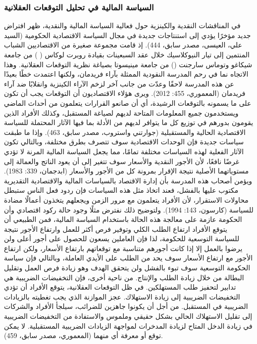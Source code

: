 \documentclass[10pt,a4paper]{report}
\begin{document}
\begin{doublespacing}
\subsubsection{السياسة المالية في تحليل التوقعات العقلانية}
في المناقشات النقدية والكينزية حول فعالية السياسة المالية والنقدية، ظهر افتراض جديد مؤخرًا يؤدي إلى استنتاجات جديدة في مجال السياسة الاقتصادية الحكومية {(السيد علي، العيسى، مصدر سابق، 444)}. إذ قامت مجموعة صغيرة من الاقتصاديين الشباب المنتمين إلى تيار النيوكلاسيك خلال عقد السبعينات بقيادة {روبرت لوكاس ( )} من جامعة شيكاغو و{توماس سارجنت ()} من جامعة مينيسوتا بصياغة نظرية التوقعات العقلانية. وهذا الاتجاه نما في رحم المدرسة النقودية الممثلة بآراء {فريدمان}، ولكنها اعتمدت خطًا بعيدًا عن هذه المدرسة لاحقًا وعدّت من جانب آخر لزخم الآراء الكينزية وانقلابًا ضد آراء {فريدمان} {(المعموري، 455: 2012)}. ويرى هؤلاء الاقتصاديون أن التوقعات يجب أن تكون على ما يسمونه بالتوقعات الرشيدة، أي أن صانعو القرارات يتعلمون من أحداث الماضي ويستخدمون جميع المعلومات المتاحة لديهم لصياغة المستقبل، وكذلك الأفراد الذين يقومون بدورهم في توزيع كل ما يتوافر لديهم من الأدلة بما فيها الآثار المحتملة للسياسة الاقتصادية الحالية والمستقبلية {(جوارتني واستروب، مصدر سابق، 463)}. وإذا ما طبقت سياسات جديدة فإن الوحدات الاقتصادية سوف تتصرف بطرق مختلفة، وبالتالي تكون الآثار الفعلية لهذه السياسات مختلفة تمامًا، مما يجعل السياسة المالية المرنة لا تؤدي غرضًا نافعًا، لأن الأجور النقدية والأسعار سوف تتغير إلى أن يعود الناتج والعمالة إلى مستوياتهما الأصلية نتيجة الإقرار بمرونة كل من الأجور والأسعار {(ابدجمان، 339: 1983)}. ويؤمن أصحاب هذه المدرسة بأن إدارة الاقتصاد بالسياسات المالية والاقتصادية التقديرية مكتوب عليها بالفشل، فعند اتخاذ مثل هذه السياسات فإن ردود فعل الناس ستبطل محاولات الاستقرار، لأن الأفراد يتعلمون مع مرور الزمن ويجعلهم يتخذون أعمالًا مضادة للسياسة {(كارسون، 143: 1994)}. ولتوضيح ذلك نفترض مثلًا وجود حالة ركود اقتصادي وأن الحكومة عازمة على معالجة هذه الحالة باستخدام السياسة المالية، فمن الطبيعي أن يتوقع الأفراد ارتفاع الطلب الكلي وتوفير فرص أكثر للعمل وارتفاع الأجور نتيجة للسياسة التوسعية للحكومة، لذا فإن العاملين يسعون للحصول على أجور أعلى ولن يرضوا بالعمل إلا إذا كانت أجورهم متناسبة مع توقعاتهم بارتفاع الأسعار، ولكن ارتفاع الأجور مع ارتفاع الأسعار سوف يحد من الطلب على الأيدي العاملة، وبالتالي فإن سياسة الحكومة التوسعية سوف تبوء بالفشل ولن يتحقق الهدف وهو زيادة فرص العمل وتقليل البطالة من خلال زيادة الطلب والإنتاج. من ناحية أخرى، فإن التخفيضات الضريبية هي تدابير لتحفيز طلب المستهلكين. في ظل التوقعات العقلانية، يتوقع الأفراد أن تؤدي التخفيضات الضريبية إلى زيادة الاستهلاك. عجز الموازنة الذي يجب تغطيته بالزيادات الضريبية في المستقبل. من أجل أن يكونوا جاهزين للضرائب، سيلجأ الأفراد والشركات إلى تقليل الاستهلاك الحالي بشكل حقيقي وملموس والاستفادة من التخفيضات الضريبية في زيادة الدخل المتاح لزيادة المدخرات لمواجهة الزيادات الضريبية المستقبلية. لا يمكن توقع أو معرفة أي منهما {(المعموري، مصدر سابق، 459)}.

\end{doublespacing}
\end{document}

